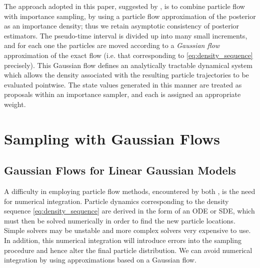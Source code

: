 \documentclass{article}
\begin{document}
The approach adopted in this paper, suggested by \cite{Reich2012}, is to combine particle flow with importance sampling, by using a particle flow approximation of the posterior as an importance density; thus we retain asymptotic consistency of posterior estimators. The pseudo-time interval is divided up into many small increments, and for each one the particles are moved according to a \emph{Gaussian flow} approximation of the exact flow (i.e. that corresponding to \eqref{eq:density_sequence} precisely). This Gaussian flow defines an analytically tractable dynamical system which allows the density associated with the resulting particle trajectories to be evaluated pointwise. The state values generated in this manner are treated as proposals within an importance sampler, and each is assigned an appropriate weight.



\section{Sampling with Gaussian Flows}

\subsection{Gaussian Flows for Linear Gaussian Models}

A difficulty in employing particle flow methods, encountered by both \cite{Daum2011d,Reich2011}, is the need for numerical integration. Particle dynamics corresponding to the density sequence \eqref{eq:density_sequence} are derived in the form of an ODE or SDE, which must then be solved numerically in order to find the new particle locations. Simple solvers may be unstable and more complex solvers very expensive to use. In addition, this numerical integration will introduce errors into the sampling procedure and hence alter the final particle distribution. We can avoid numerical integration by using approximations based on a Gaussian flow.
\end{document}
